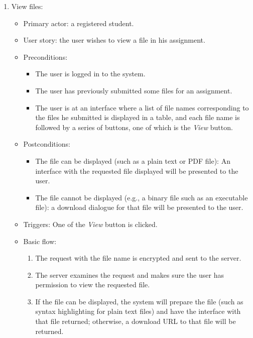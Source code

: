 \begin{enumerate}
\item View files:
\begin{itemize}
    \item Primary actor: a registered student.
    \item User story: the user wishes to view a file in his assignment.
    \item Preconditions:
        \begin{itemize}
            \item The user is logged in to the system.
            \item The user has previously submitted some files for an
                assignment.
            \item The user is at an interface where a list of file names
                corresponding to the files he submitted is displayed in a table,
                and each file name is followed by a series of buttons,
                one of which is the \emph{View} button.
        \end{itemize}
    \item Postconditions:
        \begin{itemize}
            \item The file can be displayed (such as a plain text or PDF file): 
                An interface with the requested file
                displayed will be presented to the user.
            \item The file cannot be displayed (e.g., a binary file such as an executable
                file): a download dialogue for that file will be presented to
                the user.
        \end{itemize}
    \item Triggers: 
        One of the \emph{View} button is clicked.
    \item Basic flow:
        \begin{enumerate}
            \item The request with the file name is encrypted and sent to the server.
            \item The server examines the request and makes sure the user
                has permission to view the requested file.
            \item If the file can be displayed, the system will prepare the
                file (such as syntax highlighting for plain text files) and
                have the interface with that file returned; otherwise, a download
                URL to that file will be returned.
        \end{enumerate}
\end{itemize}
\end{enumerate}


